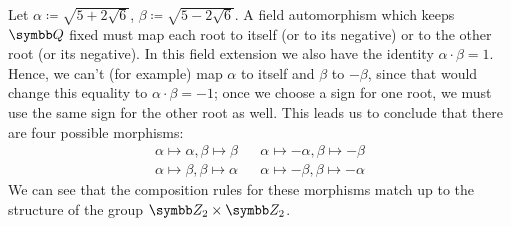 \begin{solution}
Let \(\alpha \coloneq \sqrt{5 + 2 \sqrt{6}}\), \(\beta \coloneq \sqrt{5 - 2 \sqrt{6}}\). A field automorphism which keeps \(\rationals\) fixed must map each root to itself (or to its negative) or to the other root (or its negative). In this field extension we also have the identity \(\alpha \cdot \beta = 1\). Hence, we can't (for example) map \(\alpha\) to itself and \(\beta\) to \(-\beta\), since that would change this equality to \(\alpha \cdot \beta = -1\); once we choose a sign for one root, we must use the same sign for the other root as well. This leads us to conclude that there are four possible morphisms:
\begin{align*}
    \alpha \mapsto \alpha, \beta \mapsto \beta & & \alpha \mapsto -\alpha, \beta \mapsto -\beta \\[1em]
    \alpha \mapsto \beta, \beta \mapsto \alpha & & \alpha \mapsto -\beta, \beta \mapsto -\alpha
\end{align*}
We can see that the composition rules for these morphisms match up to the structure of the group \(\integersmod{2} \times \integersmod{2}\).
\end{solution}

